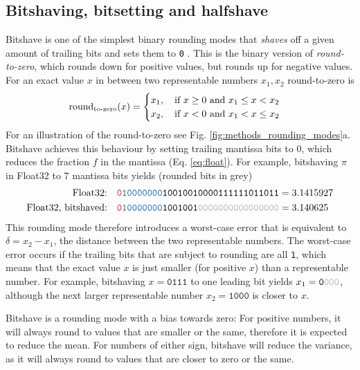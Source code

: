 \subsection{Bitshaving, bitsetting and halfshave}
\label{sec:bitshave}

Bitshave is one of the simplest binary rounding modes that \emph{shaves} off a given amount of trailing bits and sets them to \texttt{0}
\citep{Zender2016,Kouznetsov2020}. This is the binary version of \emph{round-to-zero}, which rounds down for positive values, but
rounds up for negative values. For an exact value $x$ in between two representable numbers $x_1,x_2$ round-to-zero is
\begin{equation}
	\operatorname{round}_{\operatorname{to-zero}}(x) = \begin{cases} x_1, \quad \text{if } x \geq 0 \text{ and } x_1 \leq x < x_2 \\
									x_2, \quad \text{if } x < 0 \text{ and } x_1 < x \leq x_2 \end{cases}
	\label{eq:round_zero}
\end{equation}
For an illustration of the round-to-zero see Fig. \ref{fig:methods_rounding_modes}a. Bitshave achieves this behaviour
by setting trailing mantissa bits to 0, which reduces the fraction $f$ in the mantissa (Eq. \ref{eq:float}). For example,
bitshaving $\pi$ in Float32 to 7 mantissa bits yields (rounded bits in grey)
\begin{align}
	\text{Float32:}& \quad \mathtt{{\color{psign}0}{\color{pexpo}10000000}10010010000111111011011} = 3.1415927 \nonumber \\
	\text{Float32, bitshaved:}& \quad \mathtt{{\color{psign}0}{\color{pexpo}10000000}1001001{\color{gray}0000000000000000}} = 3.140625
	\label{eq:bitshave}
\end{align}
This rounding mode therefore introduces a worst-case error that is equivalent to $\delta = x_2-x_1$, the distance between the two
representable numbers. The worst-case error occurs if the trailing bits that are subject to rounding are all \texttt{1}, which means
that the exact value $x$ is just smaller (for positive $x$) than a representable number. For example, bitshaving $x = \mathtt{0111}$
to one leading bit yields $x_1 = \mathtt{0{\color{gray}000}}$, although the next larger representable number $x_2 = \mathtt{1000}$
is closer to $x$.

Bitshave is a rounding mode with a bias towards zero: For positive numbers, it will always round to values that are smaller or the
same, therefore it is expected to reduce the mean. For numbers of either sign, bitshave will reduce the variance, as it will always
round to values that are closer to zero or the same.


